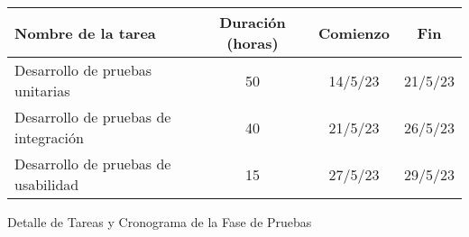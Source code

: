 \begin{planificacion}
	\centering
	\begin{tabular}{ | m{9cm} | c | c | c |}
		\hline
		\textbf{Nombre de la tarea}          & \textbf{Duración (horas)} & \textbf{Comienzo} & \textbf{Fin} \\
		\hline
		Desarrollo de pruebas unitarias      & 50                        & 14/5/23           & 21/5/23      \\
		\hline
		Desarrollo de pruebas de integración & 40                        & 21/5/23           & 26/5/23      \\
		\hline
		Desarrollo de pruebas de usabilidad  & 15                        & 27/5/23           & 29/5/23      \\
		\hline
	\end{tabular}
	\caption{Detalle de Tareas y Cronograma de la Fase de Pruebas}
\end{planificacion}
